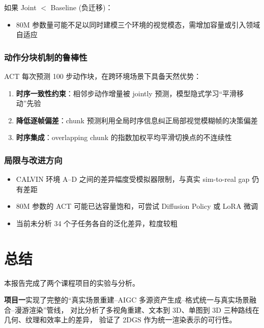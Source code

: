 \documentclass[12pt,a4paper]{ctexart}
\begin{document}
如果 Joint $<$ Baseline (负迁移)：
\begin{itemize}[leftmargin=*]
    \item 80M 参数量可能不足以同时建模三个环境的视觉模态，需增加容量或引入领域自适应
\end{itemize}

\subsubsection{动作分块机制的鲁棒性}

ACT 每次预测 100 步动作块，在跨环境场景下具备天然优势：

\begin{enumerate}[leftmargin=*]
    \item \textbf{时序一致性约束}：相邻步动作增量被 jointly 预测，模型隐式学习``平滑移动''先验
    \item \textbf{降低逐帧偏差}：chunk 预测利用全局时序信息纠正局部视觉模糊帧的决策偏差
    \item \textbf{时序集成}：overlapping chunk 的指数加权平均平滑切换点的不连续性
\end{enumerate}

\subsubsection{局限与改进方向}

\begin{itemize}[leftmargin=*]
    \item CALVIN 环境 A--D 之间的差异幅度受模拟器限制，与真实 sim-to-real gap 仍有差距
    \item 80M 参数的 ACT 可能已达容量饱和，可尝试 Diffusion Policy 或 LoRA 微调
    \item 当前未分析 34 个子任务各自的泛化差异，粒度较粗
\end{itemize}


\newpage
\section{总结}

本报告完成了两个课程项目的实验与分析。

\textbf{项目一}实现了完整的``真实场景重建--AIGC 多源资产生成--格式统一与真实场景融合--漫游渲染''管线，
对比分析了多视角重建、文本到 3D、单图到 3D 三种路线在几何、纹理和效率上的差异，
验证了 2DGS 作为统一渲染表示的可行性。
\end{document}
